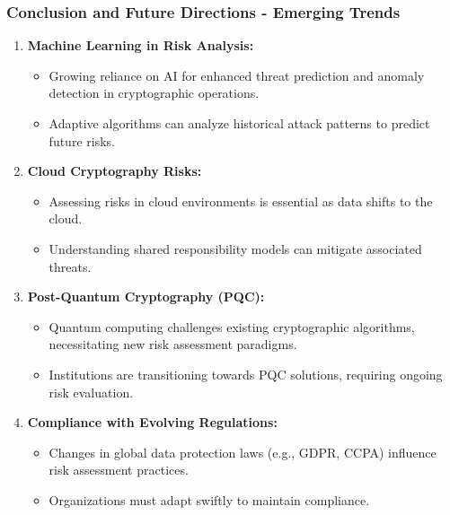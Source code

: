 \documentclass{beamer}
\begin{document}
\begin{frame}[fragile]
    \frametitle{Conclusion and Future Directions - Emerging Trends}
    \begin{enumerate}
        \item \textbf{Machine Learning in Risk Analysis:}
        \begin{itemize}
            \item Growing reliance on AI for enhanced threat prediction and anomaly detection in cryptographic operations.
            \item Adaptive algorithms can analyze historical attack patterns to predict future risks.
        \end{itemize}
        
        \item \textbf{Cloud Cryptography Risks:}
        \begin{itemize}
            \item Assessing risks in cloud environments is essential as data shifts to the cloud.
            \item Understanding shared responsibility models can mitigate associated threats.
        \end{itemize}
        
        \item \textbf{Post-Quantum Cryptography (PQC):}
        \begin{itemize}
            \item Quantum computing challenges existing cryptographic algorithms, necessitating new risk assessment paradigms.
            \item Institutions are transitioning towards PQC solutions, requiring ongoing risk evaluation.
        \end{itemize}
        
        \item \textbf{Compliance with Evolving Regulations:}
        \begin{itemize}
            \item Changes in global data protection laws (e.g., GDPR, CCPA) influence risk assessment practices.
            \item Organizations must adapt swiftly to maintain compliance.
        \end{itemize}
    \end{enumerate}
\end{frame}
\end{document}
